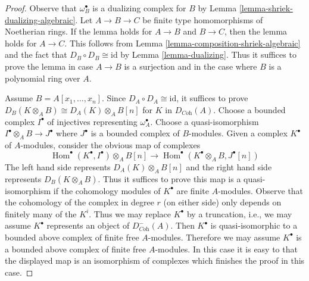 \documentclass{stacks-project}
\theoremstyle{plain}
\theoremstyle{definition}
\theoremstyle{remark}
\numberwithin{equation}{subsection}
\def\Hom{\mathop{\mathrm{Hom}}\nolimits}
\begin{document}
\begin{proof}
Observe that $\omega_B^\bullet$ is a dualizing complex for $B$ by
Lemma \ref{lemma-shriek-dualizing-algebraic}.
Let $A \to B \to C$ be finite type homomorphisms of Noetherian rings.
If the lemma holds for $A \to B$ and $B \to C$, then the lemma holds for
$A \to C$. This follows from
Lemma \ref{lemma-composition-shriek-algebraic}
and the fact that $D_B \circ D_B \cong \text{id}$ by
Lemma \ref{lemma-dualizing}.
Thus it suffices to prove the lemma in case $A \to B$ is
a surjection and in the case where $B$ is a
polynomial ring over $A$.

\medskip\noindent
Assume $B = A[x_1, \ldots, x_n]$. Since $D_A \circ D_A \cong \text{id}$,
it suffices to prove
$D_B(K \otimes_A B) \cong D_A(K) \otimes_A B[n]$ for $K$
in $D_{\textit{Coh}}(A)$.
Choose a bounded complex $I^\bullet$ of injectives representing
$\omega_A^\bullet$. Choose a quasi-isomorphism
$I^\bullet \otimes_A B \to J^\bullet$ where $J^\bullet$
is a bounded complex of $B$-modules. Given a complex
$K^\bullet$ of $A$-modules, consider the obvious
map of complexes
$$
\Hom^\bullet(K^\bullet, I^\bullet) \otimes_A B[n]
\longrightarrow
\Hom^\bullet(K^\bullet \otimes_A B, J^\bullet[n])
$$
The left hand side represents $D_A(K) \otimes_A B[n]$ and the right hand
side represents $D_B(K \otimes_A B)$. Thus it suffices to prove this
map is a quasi-isomorphism if the cohomology modules
of $K^\bullet$ are finite $A$-modules. Observe that the
cohomology of the complex in degree $r$ (on either side)
only depends on finitely many of the $K^i$. Thus we may
replace $K^\bullet$ by a truncation, i.e., we may assume
$K^\bullet$ represents an object of $D^-_{\textit{Coh}}(A)$.
Then $K^\bullet$ is quasi-isomorphic to a bounded
above complex of finite free $A$-modules.
Therefore we may assume $K^\bullet$ is a bounded
above complex of finite free $A$-modules.
In this case it is easy to that the
displayed map is an isomorphism of complexes which finishes
the proof in this case.


\end{proof}
\end{document}
